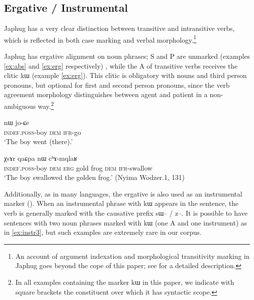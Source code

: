 \documentclass[oldfontcommands,oneside,a4paper,11pt]{article}
\newcommand{\ipa}[1]{{\phon #1}} %
\begin{document}
\subsection{Ergative / Instrumental}
Japhug has a very clear   distinction between transitive and intransitive verbs, which is reflected in both case marking and verbal morphology.\footnote{An account of argument indexation and morphological transitivity marking in Japhug goes beyond the cope of this paper; see \citet{jacques10inverse} for a detailed description.}

Japhug has ergative alignment on noun phrases; S and P are unmarked (examples \ref{ex:abs} and \ref{ex:erg} respectively) , while the A of transitive verbs receives the clitic \ipa{kɯ} (example \ref{ex:erg}). This clitic is obligatory with nouns and third person pronouns, but optional for first and second person pronouns, since  the verb agreement morphology distinguishes between agent and patient in a non-ambiguous way.\footnote{In all examples containing the marker \ipa{kɯ} in this paper, we indicate with square brackets the constituent over which it has syntactic scope.}

\begin{exe}
\ex \label{ex:abs}
\gll \ipa{tɤ-tɕɯ}  	\ipa{nɯ}  	 	\ipa{jo-ɕe}   \\
\textsc{indef.poss}-boy \textsc{dem}   \textsc{ifr}-go \\
\glt `The boy went (there).'
\end{exe}

\begin{exe}
\ex \label{ex:erg}
\gll [\ipa{tɤ-tɕɯ}  	\ipa{nɯ}]  	\ipa{\textbf{kɯ}} 	\ipa{χsɤr}  	\ipa{qaɕpa}  	\ipa{nɯ}  	\ipa{cʰɤ-mqlaʁ}   \\
\textsc{indef.poss}-boy \textsc{dem} \textsc{erg} gold frog \textsc{dem} \textsc{ifr}-swallow \\
\glt `The boy swallowed the golden frog.' (Nyima Wodzer.1, 131)
\end{exe}


Additionally, as in many languages, the ergative is also used as an instrumental marker (\citealt[32]{agent02palancar}). When an  instrumental phrase with \ipa{kɯ}  appears in the sentence, the verb is generally marked with the causative prefix \ipa{sɯ}-- / \ipa{z}--. It is possible  to have sentences with two noun phrases marked with \ipa{kɯ} (one A and one instrument) as in \ref{ex:instr3}, but such examples are extremely rare in our corpus.
\end{document}
